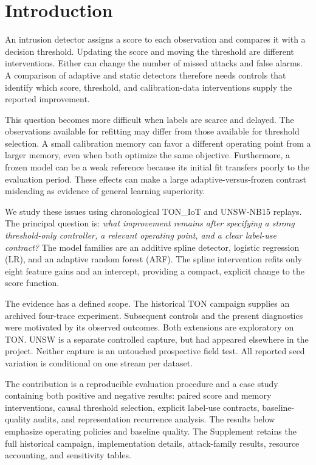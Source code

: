 \section{Introduction}
An intrusion detector assigns a score to each observation and compares it with a decision threshold. Updating the score and moving the threshold are different interventions. Either can change the number of missed attacks and false alarms. A comparison of adaptive and static detectors therefore needs controls that identify which score, threshold, and calibration-data interventions supply the reported improvement.

This question becomes more difficult when labels are scarce and delayed. The observations available for refitting may differ from those available for threshold selection. A small calibration memory can favor a different operating point from a larger memory, even when both optimize the same objective. Furthermore, a frozen model can be a weak reference because its initial fit transfers poorly to the evaluation period. These effects can make a large adaptive-versus-frozen contrast misleading as evidence of general learning superiority.

We study these issues using chronological TON\_IoT and UNSW-NB15 replays. The principal question is: \emph{what improvement remains after specifying a strong threshold-only controller, a relevant operating point, and a clear label-use contract?} The model families are an additive spline detector, logistic regression (LR), and an adaptive random forest (ARF). The spline intervention refits only eight feature gains and an intercept, providing a compact, explicit change to the score function.

The evidence has a defined scope. The historical TON campaign supplies an archived four-trace experiment. Subsequent controls and the present diagnostics were motivated by its observed outcomes. Both extensions are exploratory on TON. UNSW is a separate controlled capture, but had appeared elsewhere in the project. Neither capture is an untouched prospective field test. All reported seed variation is conditional on one stream per dataset.

The contribution is a reproducible evaluation procedure and a case study containing both positive and negative results: paired score and memory interventions, causal threshold selection, explicit label-use contracts, baseline-quality audits, and representation recurrence analysis. The results below emphasize operating policies and baseline quality. The Supplement retains the full historical campaign, implementation details, attack-family results, resource accounting, and sensitivity tables.

